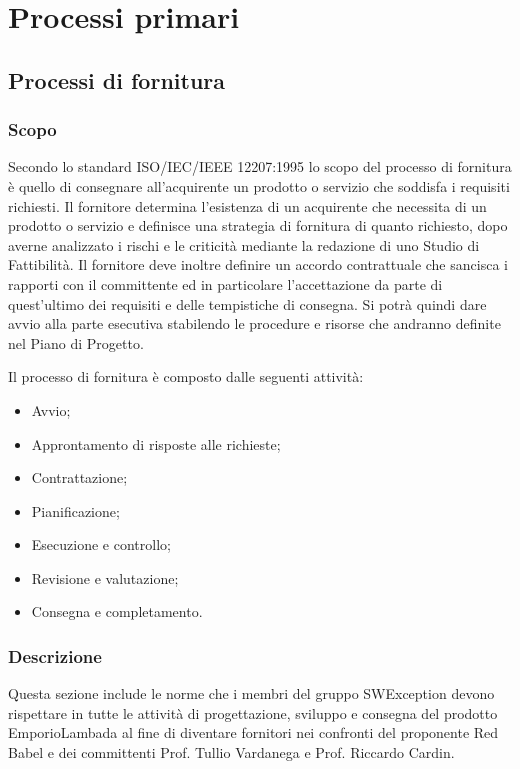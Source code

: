 \section{Processi primari}


\subsection{Processi di fornitura}
\label{_processiDiFornitura}
\subsubsection{Scopo}
Secondo lo standard ISO/IEC/IEEE 12207:1995 lo scopo del processo di fornitura è quello di consegnare all'acquirente un prodotto o servizio che soddisfa i requisiti richiesti.  Il fornitore determina l'esistenza di un acquirente che necessita di un prodotto o servizio e definisce una strategia di fornitura di quanto richiesto, dopo averne analizzato i rischi e le criticità mediante la redazione di uno Studio di Fattibilità.
Il fornitore deve inoltre definire un accordo contrattuale che sancisca i rapporti con il committente ed in particolare l'accettazione da parte di quest'ultimo dei requisiti e delle tempistiche di consegna.  Si potrà quindi dare avvio alla parte esecutiva stabilendo le procedure e risorse che andranno definite nel Piano di Progetto.

Il processo di fornitura è composto dalle seguenti attività:
\begin{itemize}
  \item Avvio;
  \item Approntamento di risposte alle richieste;
  \item Contrattazione;
  \item Pianificazione;
  \item Esecuzione e controllo;
  \item Revisione e valutazione;
  \item Consegna e completamento.
\end{itemize}

\subsubsection{Descrizione}
Questa sezione include le norme che i membri del gruppo SWException devono rispettare in tutte le attività di progettazione, sviluppo e consegna del prodotto EmporioLambada al fine di diventare fornitori nei confronti del proponente Red Babel e dei committenti Prof. Tullio Vardanega e Prof. Riccardo Cardin.
